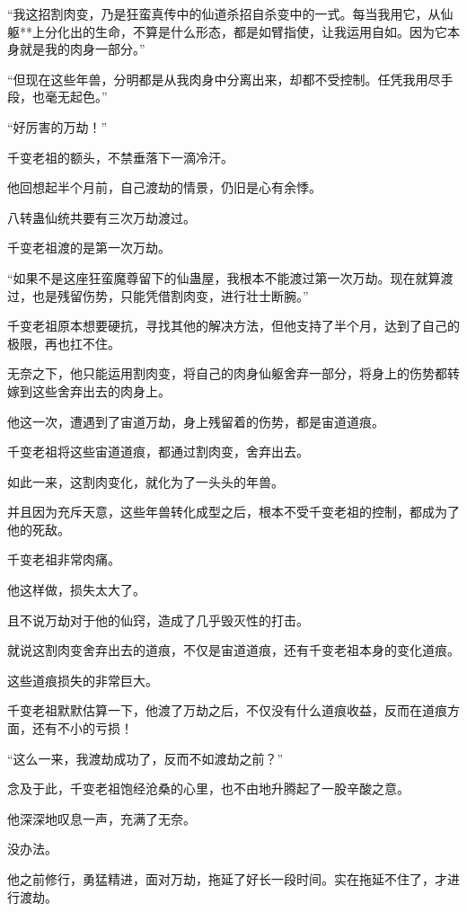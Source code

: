\begin{this_body}
“我这招割肉变，乃是狂蛮真传中的仙道杀招自杀变中的一式。每当我用它，从仙躯**上分化出的生命，不算是什么形态，都是如臂指使，让我运用自如。因为它本身就是我的肉身一部分。”

“但现在这些年兽，分明都是从我肉身中分离出来，却都不受控制。任凭我用尽手段，也毫无起色。”

“好厉害的万劫！”

千变老祖的额头，不禁垂落下一滴冷汗。

他回想起半个月前，自己渡劫的情景，仍旧是心有余悸。

八转蛊仙统共要有三次万劫渡过。

千变老祖渡的是第一次万劫。

“如果不是这座狂蛮魔尊留下的仙蛊屋，我根本不能渡过第一次万劫。现在就算渡过，也是残留伤势，只能凭借割肉变，进行壮士断腕。”

千变老祖原本想要硬抗，寻找其他的解决方法，但他支持了半个月，达到了自己的极限，再也扛不住。

无奈之下，他只能运用割肉变，将自己的肉身仙躯舍弃一部分，将身上的伤势都转嫁到这些舍弃出去的肉身上。

他这一次，遭遇到了宙道万劫，身上残留着的伤势，都是宙道道痕。

千变老祖将这些宙道道痕，都通过割肉变，舍弃出去。

如此一来，这割肉变化，就化为了一头头的年兽。

并且因为充斥天意，这些年兽转化成型之后，根本不受千变老祖的控制，都成为了他的死敌。

千变老祖非常肉痛。

他这样做，损失太大了。

且不说万劫对于他的仙窍，造成了几乎毁灭性的打击。

就说这割肉变舍弃出去的道痕，不仅是宙道道痕，还有千变老祖本身的变化道痕。

这些道痕损失的非常巨大。

千变老祖默默估算一下，他渡了万劫之后，不仅没有什么道痕收益，反而在道痕方面，还有不小的亏损！

“这么一来，我渡劫成功了，反而不如渡劫之前？”

念及于此，千变老祖饱经沧桑的心里，也不由地升腾起了一股辛酸之意。

他深深地叹息一声，充满了无奈。

没办法。

他之前修行，勇猛精进，面对万劫，拖延了好长一段时间。实在拖延不住了，才进行渡劫。


\end{this_body}
